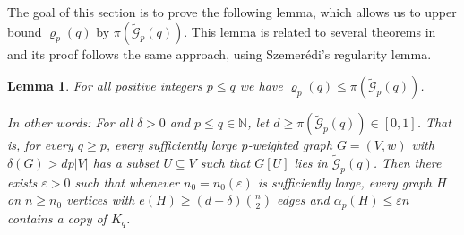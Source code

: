 \documentclass[11pt, a4paper]{article}
\newtheorem{lemma}[theorem]{Lemma}
\theoremstyle{definition}
\def\eps{{\varepsilon}}
\newcommand{\cG}{\mathcal{G}}
\begin{document}



The goal of this section is to prove the following  lemma, which allows us to upper bound $\varrho_p(q)$ by $\pi(\widetilde{\cG}_p(q))$. 
This lemma is related to several theorems in~\cite{EHSSSz} and its proof follows the same approach, using Szemer\'edi's regularity lemma.


\begin{lemma}\label{reduce}
	For all positive integers $p \leq q$ we have $\varrho_p(q) \leq \pi(\widetilde{\cG}_p(q))$.
	
	\medskip
	In other words:
	For all $\delta>0$ and $p \leq q \in \mathbb{N}$, let $d\ge \pi(\widetilde{\cG}_p(q))\in [0,1]$. That is, for every $q \geq p$,
	every sufficiently large $p$-weighted graph $G=(V,w)$ with $\delta(G) > dp|V|$ has a subset $U \subseteq V$ such that $G[U]$ lies in $\widetilde{\cG}_p(q)$. 
	Then there exists $\eps>0$ such that whenever $n_0=n_0(\eps)$ is sufficiently large,
	every graph $H$ on $n \geq n_0$ vertices with $e(H) \geq (d+\delta)\binom{n}{2}$ edges and $\alpha_p(H) \leq \eps n$ contains a copy of $K_q$.
\end{lemma}

\end{document}
